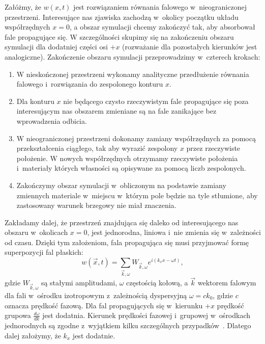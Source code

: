 Załóżmy, że $w(x,t)$ jest rozwiązaniem równania falowego w~nieograniczonej przestrzeni. Interesujące nas zjawiska zachodzą w~okolicy początku układu współrzędnych $x=0$, a obszar symulacji chcemy zakończyć tak, aby absorbował fale propagujące się. W szczególności skupimy się na zakończeniu obszaru symulacji dla dodatniej części osi $+x$ (rozważanie dla pozostałych kierunków jest analogiczne). Zakończenie obszaru symulacji przeprowadzimy w~czterech krokach:
\begin{enumerate}
	\item W nieskończonej przestrzeni wykonamy analityczne przedłużenie równania falowego i~rozwiązania do zespolonego konturu $x$.
	\item Dla konturu $x$ nie będącego czysto rzeczywistym fale propagujące się poza interesującym nas obszarem zmieniane są na fale zanikające bez wprowadzenia odbicia.
	\item W nieograniczonej przestrzeni dokonamy zamiany współrzędnych za pomocą przekształcenia ciągłego, tak aby wyrazić zespolony $x$ przez rzeczywiste położenie. W nowych współrzędnych otrzymamy rzeczywiste położenia i~materiały których własności są opisywane za pomocą liczb zespolonych.
	\item Zakończymy obszar symulacji w~obliczonym na podstawie zamiany zmiennych materiale w~miejscu w~którym pole będzie na tyle stłumione, aby zastosowany warunek brzegowy nie miał znaczenia.
\end{enumerate}

Zakładamy dalej, że przestrzeń znajdująca się daleko od interesującego nas obszaru w~okolicach $x=0$, jest jednorodna, liniowa i~nie zmienia się w~zależności od czasu. Dzięki tym założeniom, fala propagująca się musi przyjmować formę superpozycji fal płaskich:
\begin{equation}
	w(\vec{x},t)= \sum_{\vec{k},\omega} W_{\vec{k},\omega} e^{i (k_x x-\omega t)},
\end{equation}
gdzie $W_{\vec{k},\omega}$ są stałymi amplitudami, $\omega$ częstością kołową, a $\vec{k}$ wektorem falowym dla fali w~ośrodku izotropowym z~zależnością dyspersyjną $\omega=c k_0$, gdzie $c$ oznacza prędkość fazową. Dla fal propagujących się w~kierunku $+x$ prędkość grupowa $\frac{d \omega}{d k}$ jest dodatnia. Kierunek prędkości fazowej i~grupowej w~ośrodkach jednorodnych są zgodne z~wyjątkiem kilku szczególnych przypadków~\cite{teixeira1998general}. Dlatego dalej założymy, że $k_x$ jest dodatnie. 

